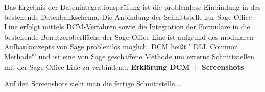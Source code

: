 Das Ergebnis der Datenintegrationsprüfung ist die problemlose Einbindung in das bestehende Datenbankschema. Die Anbindung der Schnittstelle zur Sage Office Line erfolgt mittels DCM-Verfahren sowie die Integration der Formulare in die bestehende Benutzeroberfläche der Sage Office Line ist aufgrund des modularen Aufbaukonzepts von Sage problemlos möglich. DCM heißt "'DLL Common Methode"' und ist eine von Sage geschaffene Methode um externe Schnittstellen mit der Sage Office Line zu verbinden... \textbf{Erklärung DCM + Screenshots}

Auf den Screenshots sieht man die fertige Schnittstelle...